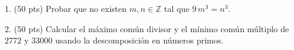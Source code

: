 \documentclass[a4paper,12pt,twoside,spanish]{amsbook}
\begin{document}

\begin{ejercicio}
	\begin{enumerate}
		\item[1.] (50 pts) Probar que no existen $m,n \in \mathbb Z$ tal que $9\, m^3=n^3$. 
		\item[2.]  (50 pts) Calcular el máximo común divisor y el mínimo común múltiplo de $2772$ y $33000$ usando la descomposición en números primos.
	\end{enumerate}
\end{ejercicio}
	
\begin{comment}
\begin{solucion}

1. Debemos probar que $\sqrt[3]{9}$ no es cociente de dos números naturales. Lo haremos por el absurdo: supongamos que $\sqrt[3]{9} = \frac{m}{n}$  con $m, n$ números naturales. 
Luego,
\begin{equation*}
	\sqrt[3]{9} = \frac{m}{n} \quad \Rightarrow  \quad  (\sqrt[3]{9})^3 = \left(\frac{m}{n}\right)^3  \quad \Rightarrow  \quad  9 = \frac{m^3}{n^3}  \quad \Rightarrow  \quad 9 {n^3}= {m^3}.
\end{equation*}
Veamos entonces que no es posible que 	$ 9 {n^3}= {m^3}$. Podemos escribir,
\begin{align*}
	 m &= 3^{k}p_1^{e_1}p_2^{e_2}\ldots p_r^{e_r},\\
	 n &= 3^{h}p_1^{f_1}p_2^{f_2}\ldots p_r^{f_r},
\end{align*}
con $p_1,\ldots,p_r$ primos distintos entre sí y distintos de 3 y cada exponente ($k,h,e_i,f_i$) no negativo.

Luego
\begin{align*}
m^3 &= 3^{3k}p_1^{3e_1}p_2^{3e_2}\ldots p_r^{3e_r},\\
n^3 &= 3^{3h}p_1^{3f_1}p_2^{3f_2}\ldots p_r^{3f_r},
\end{align*}
y por lo tanto
\begin{align*}
9 {n^3}&= {m^3}&\quad &\Leftrightarrow \\
	3^2  3^{3h}p_1^{3f_1}p_2^{3f_2}\ldots p_r^{3f_r}&= 3^{3k}p_1^{3e_1}p_2^{3e_2}\ldots p_r^{3e_r}&\quad &\Leftrightarrow  \\
		  3^{3h+2}p_1^{3f_1}p_2^{3f_2}\ldots p_r^{3f_r}&= 3^{3k}p_1^{3e_1}p_2^{3e_2}\ldots p_r^{3e_r}. &&
\end{align*}
Por el teorema fundamental de la aritmética, el exponente de $3$  a la izquierda de la igualdad debe ser igual al exponente de $3$  a la derecha de la igualdad,  es decir $3h+2 = 3k$, lo cual implica que $2= 3(k-h)$ $\Rightarrow$ $3|2$, absurdo.


\end{comment}
\end{document}
